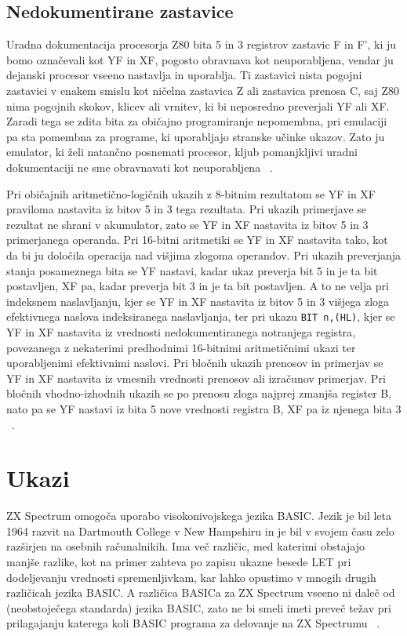 \documentclass[a4paper, 12pt, openright]{book}
\begin{document}
    \subsection{Nedokumentirane zastavice}

    Uradna dokumentacija procesorja Z80 bita 5 in 3 registrov zastavic F in F',
    ki ju bomo označevali kot YF in XF, pogosto obravnava kot neuporabljena,
    vendar ju dejanski procesor vseeno nastavlja in uporablja. Ti zastavici nista
    pogojni zastavici v enakem smislu kot ničelna zastavica Z ali zastavica prenosa
    C, saj Z80 nima pogojnih skokov, klicev ali vrnitev, ki bi neposredno
    preverjali YF ali XF. Zaradi tega se zdita bita za običajno programiranje nepomembna,
    pri emulaciji pa sta pomembna za programe, ki uporabljajo stranske učinke ukazov.
    Zato ju emulator, ki želi natančno posnemati procesor, kljub pomanjkljivi
    uradni dokumentaciji ne sme obravnavati kot neuporabljena ~\cite{theundocumentedz80documented}.

    Pri običajnih aritmetično-logičnih ukazih z 8-bitnim rezultatom se YF in XF praviloma
    nastavita iz bitov 5 in 3 tega rezultata. Pri ukazih primerjave se rezultat
    ne shrani v akumulator, zato se YF in XF nastavita iz bitov 5 in 3 primerjanega
    operanda. Pri 16-bitni aritmetiki se YF in XF nastavita tako, kot da bi ju določila
    operacija nad višjima zlogoma operandov. Pri ukazih preverjanja stanja
    posameznega bita se YF nastavi, kadar ukaz preverja bit 5 in je ta bit postavljen,
    XF pa, kadar preverja bit 3 in je ta bit postavljen. A to ne velja pri
    indeksnem naslavljanju, kjer se YF in XF nastavita iz bitov 5 in 3 višjega zloga
    efektivnega naslova indeksiranega naslavljanja, ter pri ukazu \texttt{BIT n,(HL)},
    kjer se YF in XF nastavita iz vrednosti nedokumentiranega notranjega
    registra, povezanega z nekaterimi predhodnimi 16-bitnimi aritmetičnimi ukazi ter
    uporabljenimi efektivnimi naslovi. Pri bločnih ukazih prenosov in primerjav
    se YF in XF nastavita iz vmesnih vrednosti prenosov ali izračunov primerjav. Pri
    bločnih vhodno-izhodnih ukazih se po prenosu zloga najprej zmanjša register B,
    nato pa se YF nastavi iz bita 5 nove vrednosti registra B, XF pa iz njenega bita
    3 ~\cite{theundocumentedz80documented}.

    \section{Ukazi}
    ZX Spectrum omogoča uporabo visokonivojskega jezika BASIC. Jezik je bil leta 1964
    razvit na Dartmouth College v New Hampshiru in je bil v svojem času zelo razširjen
    na osebnih računalnikih. Ima več različic, med katerimi obstajajo manjše razlike,
    kot na primer zahteva po zapisu ukazne besede LET pri dodeljevanju vrednosti
    spremenljivkam, kar lahko opustimo v mnogih drugih različicah jezika BASIC.
    A različica BASICa za ZX Spectrum vseeno ni daleč od (neobstoječega standarda)
    jezika BASIC, zato ne bi smeli imeti preveč težav pri prilagajanju katerega koli
    BASIC programa za delovanje na ZX Spectrumu ~\cite{zxspectrumintroduction}.
\end{document}
